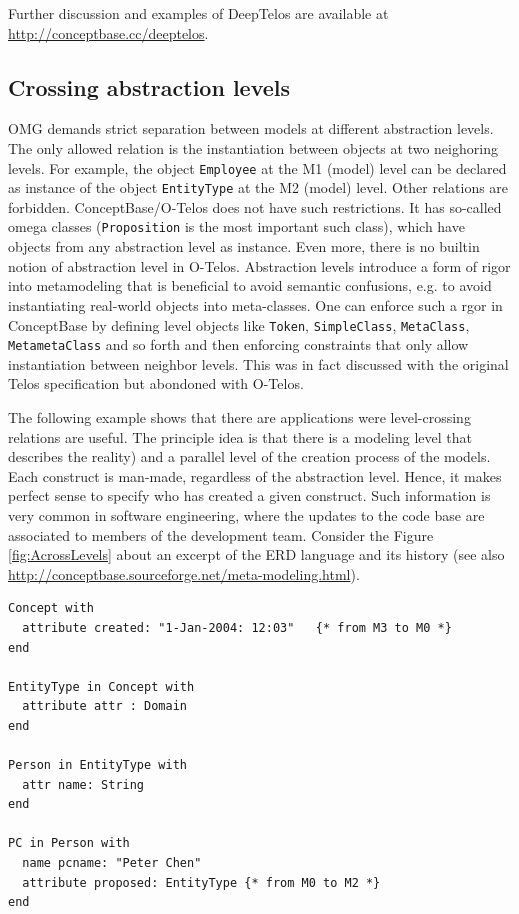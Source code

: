 Further discussion and examples of DeepTelos are available at \url{http://conceptbase.cc/deeptelos}.



\subsection{Crossing abstraction levels} \label{sec:crosslev}

OMG demands strict separation between models at different abstraction levels. 
The only allowed relation is the instantiation between objects at two neighoring
levels. For example, the object {\tt Employee} at the M1 (model) level can
be declared as instance of the  object {\tt EntityType} at the M2 (model) level.
Other relations are forbidden. ConceptBase/O-Telos does not have such restrictions. It has
so-called omega classes ({\tt Proposition} is the most important such class),
which have objects from any abstraction level as instance. Even more, there is no 
builtin notion of abstraction level in O-Telos. Abstraction levels introduce a form
of rigor into metamodeling that is beneficial to avoid semantic confusions, e.g.
to avoid instantiating real-world objects into meta-classes. One can enforce such
a rgor in ConceptBase by defining level objects like {\tt Token}, {\tt SimpleClass},
{\tt MetaClass}, {\tt MetametaClass} and so forth and then enforcing constraints that 
only allow instantiation between neighbor levels. This was in fact discussed with the
original Telos specification but abondoned with O-Telos.


The following example shows that there are applications were level-crossing
relations are useful. The principle idea is that there is a modeling level
that describes the reality) and a parallel level of the creation process of
the models. Each construct is man-made, regardless of the abstraction level. Hence,
it makes perfect sense to specify who has created a given construct. Such information
is very common in software engineering, where the updates to the code base are
associated to members of the development team. Consider the  Figure \ref{fig:AcrossLevels}
about an excerpt of the ERD language and its history (see also 
\url{http://conceptbase.sourceforge.net/meta-modeling.html}).

{\small
\begin{verbatim}
Concept with
  attribute created: "1-Jan-2004: 12:03"   {* from M3 to M0 *}
end

EntityType in Concept with  
  attribute attr : Domain
end 

Person in EntityType with
  attr name: String
end

PC in Person with
  name pcname: "Peter Chen"
  attribute proposed: EntityType {* from M0 to M2 *}
end
\end{verbatim}
}

